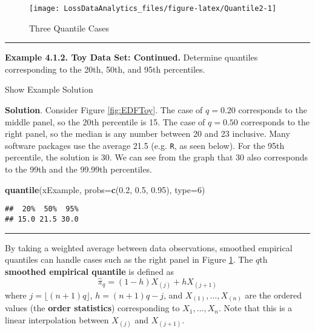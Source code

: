 \documentclass[]{book}
\newenvironment{Shaded}{\begin{snugshade}}{\end{snugshade}}
\newcommand{\KeywordTok}[1]{\textcolor[rgb]{0.13,0.29,0.53}{\textbf{#1}}}
\newcommand{\DataTypeTok}[1]{\textcolor[rgb]{0.13,0.29,0.53}{#1}}
\newcommand{\DecValTok}[1]{\textcolor[rgb]{0.00,0.00,0.81}{#1}}
\newcommand{\FloatTok}[1]{\textcolor[rgb]{0.00,0.00,0.81}{#1}}
\newcommand{\NormalTok}[1]{#1}
\theoremstyle{definition}
\theoremstyle{definition}
\theoremstyle{definition}
\theoremstyle{remark}
\begin{document}
\begin{figure}

{\centering \texttt{[image: LossDataAnalytics\_files/figure-latex/Quantile2-1]} 

}

\caption{Three Quantile Cases}\label{fig:Quantile2}
\end{figure}

\begin{center}\rule{0.5\linewidth}{\linethickness}\end{center}

\textbf{Example 4.1.2. Toy Data Set: Continued.} Determine quantiles
corresponding to the 20th, 50th, and 95th percentiles.

Show Example Solution

\hypertarget{toggleExampleSelect.1.2}{}
\textbf{Solution}. Consider Figure \ref{fig:EDFToy}. The case of
\(q=0.20\) corresponds to the middle panel, so the 20th percentile is
15. The case of \(q=0.50\) corresponds to the right panel, so the median
is any number between 20 and 23 inclusive. Many software packages use
the average 21.5 (e.g. \texttt{R}, as seen below). For the 95th
percentile, the solution is 30. We can see from the graph that 30 also
corresponds to the 99th and the 99.99th percentiles.

\begin{Shaded}
\begin{Highlighting}[]
\KeywordTok{quantile}\NormalTok{(xExample, }\DataTypeTok{probs=}\KeywordTok{c}\NormalTok{(}\FloatTok{0.2}\NormalTok{, }\FloatTok{0.5}\NormalTok{, }\FloatTok{0.95}\NormalTok{), }\DataTypeTok{type=}\DecValTok{6}\NormalTok{)}
\end{Highlighting}
\end{Shaded}

\begin{verbatim}
##  20%  50%  95% 
## 15.0 21.5 30.0
\end{verbatim}

\begin{center}\rule{0.5\linewidth}{\linethickness}\end{center}

By taking a weighted average between data observations, smoothed
empirical quantiles can handle cases such as the right panel in Figure
\ref{fig:Quantile2}. The \(q\)th \textbf{smoothed empirical quantile} is
defined as \[\hat{\pi}_q = (1-h) X_{(j)} + h X_{(j+1)}\] where
\(j=\lfloor(n+1)q\rfloor\), \(h=(n+1)q-j\), and
\(X_{(1)}, \ldots, X_{(n)}\) are the ordered values (the \textbf{order
statistics}) corresponding to \(X_1, \ldots, X_n\). Note that this is a
linear interpolation between \(X_{(j)}\) and \(X_{(j+1)}\).
\end{document}
